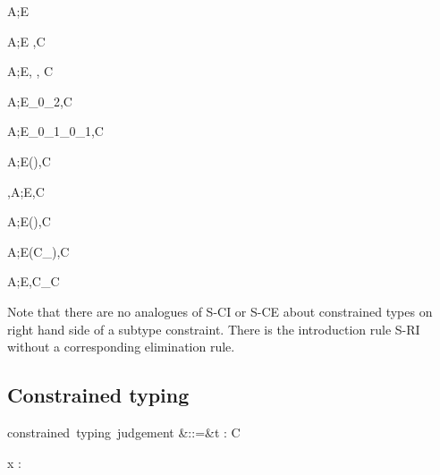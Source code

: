 \documentclass{amsart}
\theoremstyle{definition}
\begin{document}
\infrule[S-vacuous]
{}
{A;E\vdash\emptyset}

{A;E \vdash \tau\Sub\tau,C}

{A;E\vdash \sigma\Sub\tau, \sigma\Sub\tau, C}

{A;E\vdash \tau_0\Sub\tau_2,C}

{A;E\vdash\sigma_0\R\sigma_1\Sub\tau_0\R\tau_1,C}


{A;E\vdash(\All\alpha\sigma)\Sub\tau,C}

{\alpha,A;E\vdash\sigma\Sub\tau,C}

{A;E\vdash\sigma\Sub(\All\alpha\tau),C}

{A;E\vdash (\sigma\Given C_\sigma)\Sub\tau,C}

{A;E\vdash \sigma\Sub\tau,C_\sigma\cup C}

Note that there are no analogues of \textsc{S-CI} or
\textsc{S-CE} about constrained types on right hand side of a
subtype constraint. There is the introduction rule \textsc{S-RI}
without a corresponding elimination rule.

\subsection{Constrained typing}
\begin{syntax}
\mbox{constrained typing judgement}
&::=&\Gamma \vdash t : \tau \Given C
\end{syntax}%
{\Gamma\vdash x : \tau \Given \emptyset}
\end{document}
